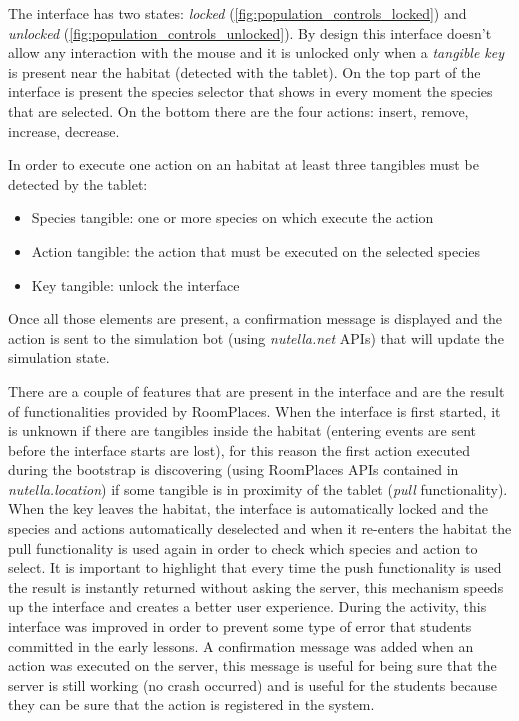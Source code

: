 The interface has two states: \textit{locked} (\ref{fig:population_controls_locked}) and \textit{unlocked} (\ref{fig:population_controls_unlocked}). By design this interface doesn't allow any interaction with the mouse and it is unlocked only when a \textit{tangible key} is present near the habitat (detected with the tablet). On the top part of the interface is present the species selector that shows in every moment the species that are selected. On the bottom there are the four actions: insert, remove, increase, decrease. 

In order to execute one action on an habitat at least three tangibles must be detected by the tablet:
\begin{itemize}
    \item Species tangible: one or more species on which execute the action
    \item Action tangible: the action that must be executed on the selected species
    \item Key tangible: unlock the interface
\end{itemize}
Once all those elements are present, a confirmation message is displayed and the action is sent to the simulation bot (using \textit{nutella.net} APIs) that will update the simulation state.

There are a couple of features that are present in the interface and are the result of functionalities provided by RoomPlaces. When the interface is first started, it is unknown if there are tangibles inside the habitat (entering events are sent before the interface starts are lost), for this reason the first action executed during the bootstrap is discovering (using RoomPlaces APIs contained in \textit{nutella.location}) if some tangible is in proximity of the tablet (\textit{pull} functionality). When the key leaves the habitat, the interface is automatically locked and the species and actions automatically deselected and when it re-enters the habitat the pull functionality is used again in order to check which species and action to select. It is important to highlight that every time the push functionality is used the result is instantly returned without asking the server, this mechanism speeds up the interface and creates a better user experience. During the activity, this interface was improved in order to prevent some type of error that students committed in the early lessons. A confirmation message was added when an action was executed on the server, this message is useful for being sure that the server is still working (no crash occurred) and is useful for the students because they can be sure that the action is registered in the system.

